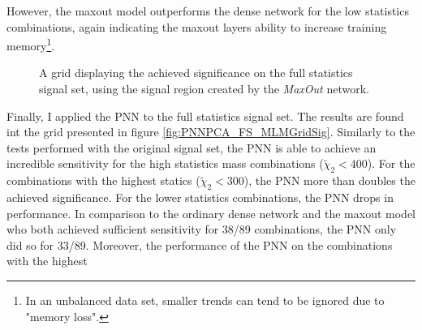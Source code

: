 However, the maxout model outperforms the dense network for the low statistics combinations, again indicating the maxout layers
ability to increase training memory\footnote{In an unbalanced data set, smaller trends can tend to be ignored due to "memory loss".}.\\
\begin{figure}
    \caption{A grid displaying the achieved significance on the full statistics signal set, using the signal region 
    created by the \emph{MaxOut} network.}
    \label{fig:MaxOutPCA_FS_MLMGridSig}
\end{figure}
Finally, I applied the \ac{PNN} to the full statistics signal set. The results are found int the grid presented in figure \ref{fig:PNNPCA_FS_MLMGridSig}.
Similarly to the tests performed with the original signal set, the \ac{PNN} is able to achieve an incredible sensitivity for the high statistics mass combinations
($\tilde{\chi}_2<400$). For the combinations with the highest statics ($\tilde{\chi}_2<300$), the \ac{PNN} more than doubles the achieved significance.
For the lower statistics combinations, the \ac{PNN} drops in performance. In comparison to the ordinary dense network and the maxout model who both achieved
sufficient sensitivity for 38/89 combinations, the \ac{PNN} only did so for 33/89. Moreover, the performance of the \ac{PNN} on the combinations with the highest 
